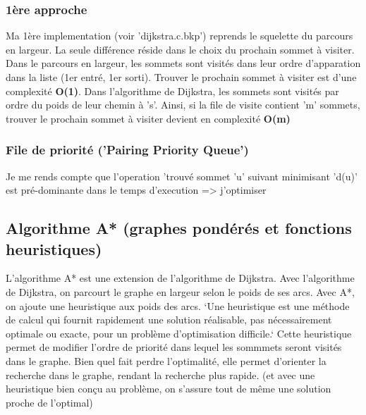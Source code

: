 \documentclass[a4paper,10pt]{article}
\begin{document}
    \subsubsection{1ère approche}
      Ma 1ère implementation (voir 'dijkstra.c.bkp') reprends le squelette du parcours en largeur.
      La seule différence réside dans le choix du prochain sommet à visiter.\newline
      Dans le parcours en largeur, les sommets sont visités dans leur ordre d'apparation dans la liste (1er entré, 1er sorti).
      Trouver le prochain sommet à visiter est d'une complexité \textbf{O(1)}.\newline\newline
      Dans l'algorithme de Dijkstra, les sommets sont visités par ordre du poids de leur chemin à 's'.
      Ainsi, si la file de visite contient 'm' sommets, trouver le prochain sommet à visiter devient en complexité \textbf{O(m)}
    \subsubsection{File de priorité ('Pairing Priority Queue')}
      Je me rends compte que l'operation 'trouvé sommet 'u' suivant minimisant 'd(u)' est pré-dominante dans le temps d'execution => j'optimiser
  \newpage
  \subsection{Algorithme A* (graphes pondérés et fonctions heuristiques)}
    L'algorithme A* est une extension de l'algorithme de Dijkstra.\newline
    Avec l'algorithme de Dijkstra, on parcourt le graphe en largeur selon le poids de ses arcs.
    Avec A*, on ajoute une heuristique aux poids des arcs.\newline
    `Une heuristique est une méthode de calcul qui fournit rapidement une solution réalisable,
    pas nécessairement optimale ou exacte, pour un problème d'optimisation difficile.`\newline
    Cette heuristique permet de modifier l'ordre de priorité dans lequel les sommmets seront visités dans le graphe.
    Bien quel fait perdre l'optimalité, elle permet d'orienter la recherche dans le graphe, rendant la recherche plus rapide.
    (et avec une heuristique bien conçu au problème, on s'assure tout de même une solution proche de l'optimal)\newline\newline
    
\end{document}

